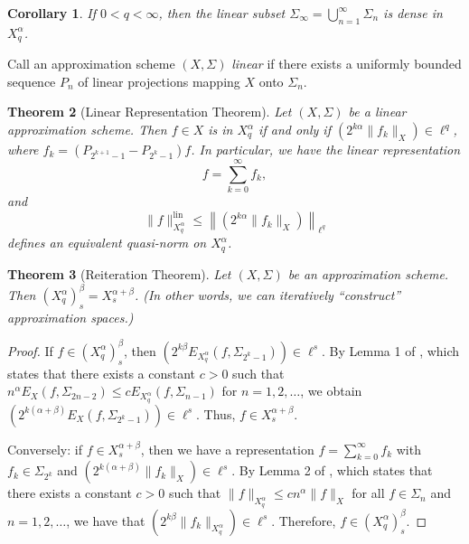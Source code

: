 \documentclass{article}
\newtheorem{theorem}{Theorem}[section]
\newtheorem{corollary}[theorem]{Corollary}
\theoremstyle{definition}
\theoremstyle{remark}
\begin{document}
\begin{corollary}
    If $0 < q < \infty$, then the linear subset $\Sigma_\infty = \bigcup_{n=1}^\infty \Sigma_n$ is dense in $X_q^\alpha$.
\end{corollary}

Call an approximation scheme $(X,\Sigma)$ \textit{linear} if there exists a uniformly bounded sequence $P_n$ of linear projections mapping $X$ onto $\Sigma_n$.

\begin{theorem}[Linear Representation Theorem]
    Let $(X,\Sigma)$ be a linear approximation scheme. Then $f \in X$ is in $X_q^\alpha$ if and only if $\left( 2^{k\alpha} \lVert f_k \rVert_X \right) \in \ell^q$, where $f_k = (P_{2^{k+1}-1} - P_{2^k-1})f$. In particular, we have the linear representation
    \[f = \sum_{k=0}^\infty f_k,\]
    and
    \[\lVert f \rVert_{X_q^\alpha}^\mathrm{lin} \leq \left\lVert \left( 2^{k\alpha} \lVert f_k \rVert_X \right) \right\rVert_{\ell^q}\]
    defines an equivalent quasi-norm on $X_q^\alpha$.
\end{theorem}

\begin{theorem}[Reiteration Theorem]
    Let $(X,\Sigma)$ be an approximation scheme. Then $(X_q^\alpha)_s^\beta = X_s^{\alpha+\beta}$. (In other words, we can iteratively “construct” approximation spaces.)
\end{theorem}

\begin{proof}
    If $f \in (X_q^\alpha)_s^\beta$, then $\left( 2^{k\beta}E_{X_q^\alpha}(f,\Sigma_{2^k-1}) \right) \in \ell^s$. By Lemma 1 of \cite[Theorem 3.2]{pietsch_approximation_1981}, which states that there exists a constant $c > 0$ such that $n^\alpha E_X(f,\Sigma_{2n-2}) \leq cE_{X_q^\alpha}(f,\Sigma_{n-1})$ for $n = 1,2,\ldots$, we obtain $\left( 2^{k(\alpha+\beta)}E_X(f, \Sigma_{2^k-1}) \right) \in \ell^s$. Thus, $f \in X_s^{\alpha+\beta}$.
    
    Conversely: if $f \in X_s^{\alpha+\beta}$, then we have a representation $f = \sum_{k=0}^\infty f_k$ with $f_k \in \Sigma_{2^k}$ and $\left( 2^{k(\alpha+\beta)}\lVert f_k \rVert_X \right) \in \ell^s$. By Lemma 2 of \cite[Theorem 3.2]{pietsch_approximation_1981}, which states that there exists a constant $c > 0$ such that $\lVert f \rVert_{X_q^\alpha} \leq cn^\alpha\lVert f \rVert_{X}$ for all $f \in \Sigma_n$ and $n = 1,2,\ldots$, we have that $\left( 2^{k\beta}\lVert f_k \rVert_{X_q^\alpha} \right) \in \ell^s$. Therefore, $f \in (X_q^\alpha)_s^\beta$.
\end{proof}
\end{document}
